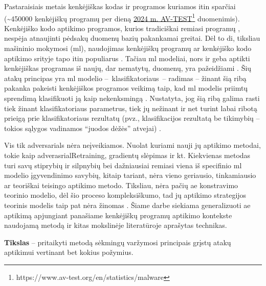 
Pastaraisiais metais kenkėjiškas kodas ir programos kuriamos itin sparčiai (\sim450000 kenkėjiškų programų per dieną \href{https://www.av-test.org/en/statistics/malware/}{2024 m. AV-TEST}\footnote{https://www.av-test.org/en/statistics/malware} duomenimis). Kenkėjiško kodo aptikimo programos, kurios tradiciškai remiasi programų , nespėja atnaujinti pėdsakų duomenų bazių pakankamai greitai. Dėl to \gls{di}, tiksliau mašininio mokymosi (\gls{ml}), naudojimas kenkėjiškų programų ar kenkėjiško kodo aptikimo srityje tapo itin populiarus \cite{demetrioAdversarialEXEmplesSurvey2021}. Tačiau \gls{ml} modeliai, nors ir geba aptikti kenkėjiškas programas iš naujų, dar nematytų, duomenų, yra pažeidžiami  \cite{castroAIMEDEvolvingMalware2019,huGeneratingAdversarialMalware2017,rosenbergGenericBlackBoxEndEnd2018,zhongReinforcementLearningBased2022}. Šių atakų principas yra \gls{ml} modelio --~klasifikatoriaus~--  radimas -- žinant šią ribą pakanka pakeisti kenkėjiškos programos veikimą taip, kad \gls{ml} modelis priimtų sprendimą klasifikuoti ją kaip nekenksmingą \cite{demetrioAdversarialEXEmplesSurvey2021}. Nustatyta, jog šią ribą galima rasti tiek žinant klasifikatoriaus parametrus, tiek jų nežinant ir net turint labai ribotą prieigą prie klasifikatoriaus rezultatų (pvz., klasifikacijos rezultatą be tikimybių -- tokios sąlygos vadinamos \enquote{juodos dėžės} atvejai) \cite{fangEvadingMalwareEngines2019}.

Vis tik \glspl{adversarial} nėra neįveikiamos. Nuolat kuriami nauji jų aptikimo metodai, tokie kaip \gls{adverasrialRetraining}, gradientų slėpimas ir kt. Kiekvienas metodas turi savų stiprybių ir silpnybių bei dažniausiai remiasi viena iš specifinio \gls{ml} modelio įgyvendinimo savybių, kitaip tariant, nėra vieno geriausio, tinkamiausio ar teoriškai teisingo  aptikimo metodo. 
Tiksliau, nėra pačių \gls{ae} konstravimo teorinio modelio, dėl šio proceso kompleksiškumo, tad jų aptikimo strategijos teorinis modelis taip pat nėra žinomas \cite{chakrabortySurveyAdversarialAttacks2021}. Šiame darbe siekiama generalizuoti \gls{ae} aptikimą apjungiant panašiame kenkėjiškų programų aptikimo kontekste naudojamą \LIME \cite{ribeiroWhyShouldTrust2016} metodą ir kitas mokslinėje literatūroje aprašytas technikas.

\vspace{10pt}
\textbf{Tikslas} -- pritaikyti \LIME metodą sėkmingų varžymosi principais grįstų atakų aptikimui vertinant bet kokius požymius.

